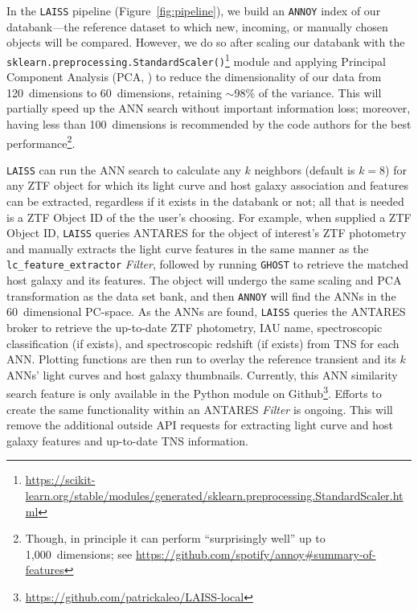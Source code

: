 \documentclass[twocolumn]{aastex63}
\newcommand{\annoy}{\texttt{ANNOY}}
\newcommand{\laiss}{\texttt{LAISS}}
\begin{document}

In the \laiss{} pipeline (Figure~\ref{fig:pipeline}), we build an \annoy{} index of our databank---the reference dataset to which new, incoming, or manually chosen objects will be compared. However, we do so after scaling our databank with the \texttt{sklearn.preprocessing.StandardScaler()}\footnote{\url{https://scikit-learn.org/stable/modules/generated/sklearn.preprocessing.StandardScaler.html}} module and applying Principal Component Analysis (PCA, \citealt{Jolliffe2002}) to reduce the dimensionality of our data from 120~dimensions to 60~dimensions, retaining $\sim$98\% of the variance. This will partially speed up the ANN search without important information loss; moreover, having less than 100~dimensions is recommended by the code authors for the best performance\footnote{Though, in principle it can perform ``surprisingly well'' up to 1,000~dimensions; see \url{https://github.com/spotify/annoy\#summary-of-features}}. \par

\laiss{} can run the ANN search to calculate any $k$ neighbors (default is $k=8$) for any ZTF object for which its light curve and host galaxy association and features can be extracted, regardless if it exists in the databank or not; all that is needed is a ZTF Object ID of the the user's choosing. For example, when supplied a ZTF Object ID, \laiss{} queries ANTARES for the object of interest's ZTF photometry and manually extracts the light curve features in the same manner as the \texttt{lc\_feature\_extractor} \emph{Filter}, followed by running \texttt{GHOST} \citep{Gagliano2021} to retrieve the matched host galaxy and its features. The object will undergo the same scaling and PCA transformation as the data set bank, and then \annoy{} will find the ANNs in the 60~dimensional PC-space. As the ANNs are found, \laiss{} queries the ANTARES broker to retrieve the up-to-date ZTF photometry, IAU name, spectroscopic classification (if exists), and spectroscopic redshift (if exists) from TNS for each ANN. Plotting functions are then run to overlay the reference transient and its $k$ ANNs' light curves and host galaxy thumbnails. Currently, this ANN similarity search feature is only available in the Python module on Github\footnote{\url{https://github.com/patrickaleo/LAISS-local}}. Efforts to create the same functionality within an ANTARES \emph{Filter} is ongoing. This will remove the additional outside API requests for extracting light curve and host galaxy features and up-to-date TNS information. \par
\end{document}
